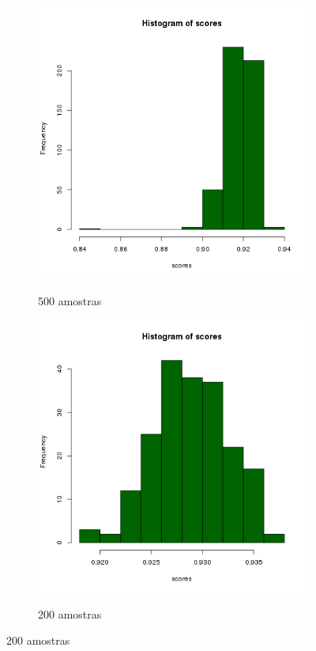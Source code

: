 \documentclass[11pt,a4paper]{article}
\begin{document}
\begin{figure}
    \caption{Histogramas - iPad 3 Safari}
    \label{safarihistogramas}
    \begin{subfigure}{.5\textwidth}
        \caption{500 amostras}
        \centering
        \includegraphics[width=\textwidth]{images/hist-freq-ipad-3-ios7-safari-500-amostras-20131119}
        \label{safarihistograma500}
    \end{subfigure}
    \begin{subfigure}{.5\textwidth}
        \caption{200 amostras}
        \centering
        \includegraphics[width=\textwidth]{images/hist-freq-ipad-3-ios7-safari-200-amostras-20131126}
        \label{safarihistograma200}
    \end{subfigure}
\end{figure}
\end{document}
